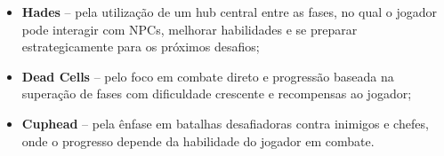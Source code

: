 \documentclass[12pt,a4paper]{article}
\begin{document}
\begin{enumerate}
\begin{itemize}
\item \textbf{Hades} – pela utilização de um hub central entre as fases, no qual o jogador pode interagir com NPCs, melhorar habilidades e se preparar estrategicamente para os próximos desafios;

\item \textbf{Dead Cells} – pelo foco em combate direto e progressão baseada na superação de fases com dificuldade crescente e recompensas ao jogador;

\item \textbf{Cuphead} – pela ênfase em batalhas desafiadoras contra inimigos e chefes, onde o progresso depende da habilidade do jogador em combate.

\end{itemize}

\end{enumerate}
\end{document}
